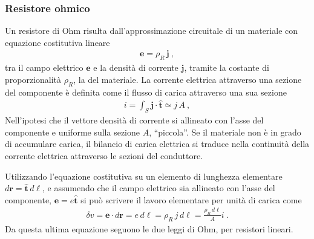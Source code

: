 \documentclass[letterpaper,10pt,english]{jupyterBook}
\begin{document}
\subsubsection{Resistore ohmico}
\label{\detokenize{ch/circuits-electric-components:resistore-ohmico}}
\sphinxAtStartPar
Un resistore di Ohm risulta dall’approssimazione circuitale di un materiale con equazione costitutiva lineare
\begin{equation*}
\begin{split}\mathbf{e} = \rho_R \, \mathbf{j} \ ,\end{split}
\end{equation*}
\sphinxAtStartPar
tra il campo elettrico \(\mathbf{e}\) e la densità di corrente \(\mathbf{j}\), tramite la costante di proporzionalità \(\rho_R\), la  del materiale. La corrente elettrica attraverso una sezione del componente è definita come il flusso di carica attraverso una sua sezione
\begin{equation*}
\begin{split}i = \int_S \mathbf{j} \cdot \hat{\mathbf{t}} \simeq j \, A \ ,\end{split}
\end{equation*}
\sphinxAtStartPar
Nell’ipotesi che il vettore densità di corrente si allineato con l’asse del componente e uniforme sulla sezione \(A\), “piccola”.
Se il materiale non è in grado di accumulare carica, il bilancio di carica elettrica si traduce nella continuità della corrente elettrica attraverso le sezioni del conduttore.

\sphinxAtStartPar
Utilizzando l’equazione costitutiva su un elemento di lunghezza elementare \(d\mathbf{r} =\hat{\mathbf{t}} \, d \ell \), e assumendo che il campo elettrico sia allineato con l’asse del componente, \(\mathbf{e} = e \hat{\mathbf{t}}\) si può scrivere il lavoro elementare per unità di carica come
\begin{equation*}
\begin{split}\delta v = \mathbf{e} \cdot d \mathbf{r} =  e \, d\ell = \rho_R \, j \, d\ell =  \frac{\rho_R \, d\ell}{A} i \ .\end{split}
\end{equation*}
\sphinxAtStartPar
Da questa ultima equazione seguono le due leggi di Ohm, per resistori lineari.
\end{document}
